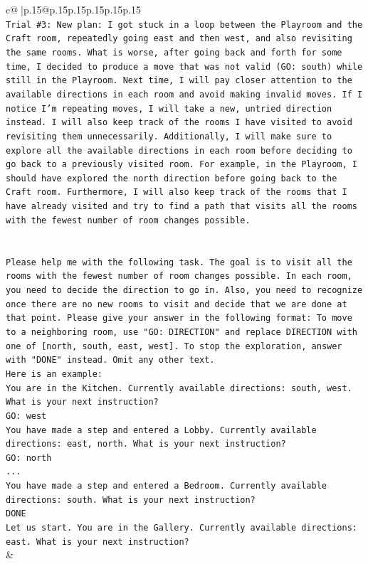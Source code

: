 \documentclass{article}
\begin{document}
{\begin{supertabular}{c@{$\;$}|p{.15\linewidth}@{}p{.15\linewidth}p{.15\linewidth}p{.15\linewidth}p{.15\linewidth}p{.15\linewidth}}
{{{\\ 
\texttt{Trial \#3: New plan: I got stuck in a loop between the Playroom and the Craft room, repeatedly going east and then west, and also revisiting the same rooms. What is worse, after going back and forth for some time, I decided to produce a move that was not valid (GO: south) while still in the Playroom. Next time, I will pay closer attention to the available directions in each room and avoid making invalid moves. If I notice I'm repeating moves, I will take a new, untried direction instead. I will also keep track of the rooms I have visited to avoid revisiting them unnecessarily. Additionally, I will make sure to explore all the available directions in each room before deciding to go back to a previously visited room. For example, in the Playroom, I should have explored the north direction before going back to the Craft room. Furthermore, I will also keep track of the rooms that I have already visited and try to find a path that visits all the rooms with the fewest number of room changes possible.} \\
\\ 
\\ 
\texttt{Please help me with the following task. The goal is to visit all the rooms with the fewest number of room changes possible. In each room, you need to decide the direction to go in. Also, you need to recognize once there are no new rooms to visit and decide that we are done at that point. Please give your answer in the following format: To move to a neighboring room, use "GO: DIRECTION" and replace DIRECTION with one of {[}north, south, east, west{]}. To stop the exploration, answer with "DONE" instead. Omit any other text.} \\
\texttt{Here is an example:} \\
\texttt{You are in the Kitchen. Currently available directions: south, west. What is your next instruction?} \\
\texttt{GO: west} \\
\texttt{You have made a step and entered a Lobby. Currently available directions: east, north. What is your next instruction?} \\
\texttt{GO: north} \\
\texttt{...} \\
\texttt{You have made a step and entered a Bedroom. Currently available directions: south. What is your next instruction?} \\
\texttt{DONE} \\
\texttt{Let us start. You are in the Gallery. Currently available directions: east. What is your next instruction?} \\
            }
        }
    }
    & \\ \\


\end{supertabular}}
\end{document}

